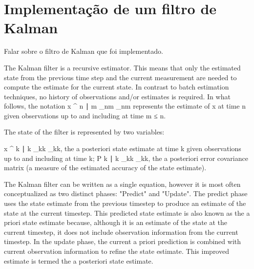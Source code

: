 \chapter{Implementação de um filtro de Kalman}\label{cap:kalman}

Falar sobre o filtro de Kalman que foi implementado.

The Kalman filter is a recursive estimator. This means that only the estimated state from the previous time step and the current measurement are needed to compute the estimate for the current state. In contrast to batch estimation techniques, no history of observations and/or estimates is required. In what follows, the notation x ^ n ∣ m {_{n\mid m}} {}_{n\mid m} represents the estimate of x {\displaystyle {} }  at time n given observations up to and including at time m ≤ n.

The state of the filter is represented by two variables:

    x ^ k ∣ k {_{k\mid k}} {}_{k\mid k}, the a posteriori state estimate at time k given observations up to and including at time k;
    P k ∣ k {\displaystyle {} _{k\mid k}}  _{k\mid k}, the a posteriori error covariance matrix (a measure of the estimated accuracy of the state estimate).

The Kalman filter can be written as a single equation, however it is most often conceptualized as two distinct phases: "Predict" and "Update". The predict phase uses the state estimate from the previous timestep to produce an estimate of the state at the current timestep. This predicted state estimate is also known as the a priori state estimate because, although it is an estimate of the state at the current timestep, it does not include observation information from the current timestep. In the update phase, the current a priori prediction is combined with current observation information to refine the state estimate. This improved estimate is termed the a posteriori state estimate.

